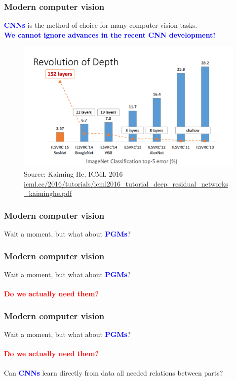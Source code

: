 \documentclass{beamer}
\newcommand\red[1]{\textcolor{red}{\textbf{#1}}}
\newcommand\blue[1]{\textcolor{blue}{\textbf{#1}}}
\begin{document}
    \begin{frame}[c]
    	\frametitle{Modern computer vision}
    	\begin{center}
    		\blue{CNNs} is the method of choice for many computer vision tasks. \\
    		\blue{We cannot ignore advances in the recent CNN development!}
    		
    		\begin{figure}
    			\includegraphics[scale=0.25]{cnn_power.png} \\
    			\scriptsize Source: Kaiming He, ICML 2016  \url{icml.cc/2016/tutorials/icml2016_tutorial_deep_residual_networks_kaiminghe.pdf}
    		\end{figure} 
    	\end{center}
    \end{frame}
    
    
    \begin{frame}[c]
       	\frametitle{Modern computer vision}
       	\begin{center}
       		Wait a moment, but what about \blue{PGMs}?
       	\end{center}
    \end{frame}
    
    \begin{frame}[c]
       	\frametitle{Modern computer vision}
       	\begin{center}
       		Wait a moment, but what about \blue{PGMs}? \\ \ \\
       		\red{Do we actually need them?}
       	\end{center}
    \end{frame}
    
    \begin{frame}[c]
       	\frametitle{Modern computer vision}
       	\begin{center}
       		Wait a moment, but what about \blue{PGMs}? \\ \ \\
       		\red{Do we actually need them?} \\ \ \\
       		Can \blue{CNNs} learn directly from data all needed relations between parts?
       	\end{center}
    \end{frame}
    
\end{document}
